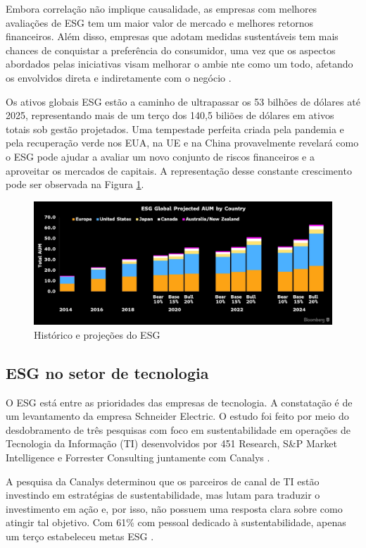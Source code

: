 \documentclass[12pt]{article}
\begin{document}
	
	Embora correlação não implique causalidade, as empresas com melhores avaliações de ESG tem um maior valor de mercado e melhores retornos financeiros. Além disso, empresas que adotam medidas sustentáveis tem mais chances de conquistar a preferência do consumidor, uma vez que os aspectos abordados pelas iniciativas visam melhorar o ambie nte como um todo, afetando os envolvidos direta e indiretamente com o negócio \cite{cabralPraticasESGAplicadas2023}.
	
	
	Os ativos globais ESG estão a caminho de ultrapassar os 53 bilhões de dólares até 2025, representando mais de um terço dos 140,5 biliões de dólares em ativos totais sob gestão projetados. Uma tempestade perfeita criada pela pandemia e pela recuperação verde nos EUA, na UE e na China provavelmente revelará como o ESG pode ajudar a avaliar um novo conjunto de riscos financeiros e a aproveitar os mercados de capitais. A representação desse constante crescimento pode ser observada na Figura \ref{fig:projections}.
	
	\begin{figure}[h]
		\centering
		\includegraphics[scale=0.2]{pictures/esg-projections.png}
		\caption{Histórico e projeções do ESG}
		\label{fig:projections}
	\end{figure}
	
	\subsection*{ESG no setor de tecnologia}
	
	O ESG está entre as prioridades das empresas de tecnologia. A constatação é de um levantamento da empresa Schneider Electric. O estudo foi feito por meio do desdobramento de três pesquisas com foco em sustentabilidade em operações de Tecnologia da Informação (TI) desenvolvidos por 451 Research, S\&P Market Intelligence e Forrester Consulting juntamente com Canalys \cite{paceteESGPrioridadePara2022}.
	
	A pesquisa da Canalys determinou que os parceiros de canal de TI estão investindo em estratégias de sustentabilidade, mas lutam para traduzir o investimento em ação e, por isso, não possuem uma resposta clara sobre como atingir tal objetivo. Com 61\% com pessoal dedicado à sustentabilidade, apenas um terço estabeleceu metas ESG \cite{paceteESGPrioridadePara2022}.
	
\end{document}
